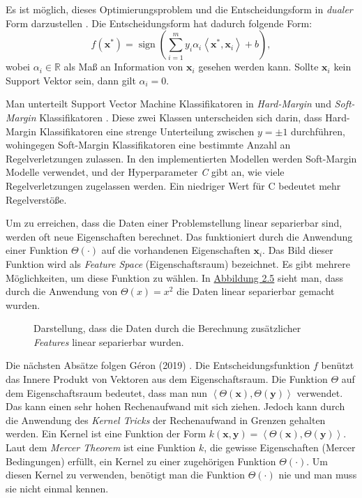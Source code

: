 Es ist m\"oglich, dieses Optimierungsproblem und die Entscheidungsform in \textit{dualer} Form darzustellen \cite[Seite 168]{handson}. Die Entscheidungsform hat dadurch folgende Form:
$$ f(\mathbf{x^*}) = \operatorname{sign}(\sum_{i=1}^m y_i\alpha_i \left\langle \mathbf{x^*}, \mathbf{x}_i \right\rangle + b), $$
wobei $\alpha_i \in \mathbb{R}$ als Ma{\ss} an Information von $\mathbf{x}_i$ gesehen werden kann. Sollte $\mathbf{x}_i$ kein Support Vektor sein, dann gilt $\alpha_i = 0$.

Man unterteilt Support Vector Machine Klassifikatoren in \textit{Hard-Margin} und \textit{Soft-Margin} Klassifikatoren \cite[Kapitel 15]{shalev}. Diese zwei Klassen
unterscheiden sich darin, dass Hard-Margin Klassifikatoren eine strenge Unterteilung zwischen $y = \pm1$ durchf\"uhren, wohingegen Soft-Margin
Klassifikatoren eine bestimmte Anzahl an Regelverletzungen zulassen. In den implementierten Modellen werden Soft-Margin Modelle verwendet, und der
Hyperparameter \textit{C} gibt an, wie viele Regelverletzungen zugelassen werden. Ein niedriger Wert f\"ur C bedeutet mehr Regelverst\"o{\ss}e.

Um zu erreichen, dass die Daten einer Problemstellung linear separierbar sind, werden oft neue Eigenschaften berechnet. Das funktioniert durch die
Anwendung einer Funktion $\Theta(\cdot)$ auf die vorhandenen Eigenschaften $\mathbf{x}_i$. Das Bild dieser Funktion wird als \textit{Feature Space} (Eigenschaftsraum) bezeichnet.
Es gibt mehrere M\"oglichkeiten, um diese Funktion zu w\"ahlen. In
\hyperref[fig:svm2]{Abbildung 2.5} sieht man, dass durch die Anwendung von $\Theta(x) = x^2$ die Daten linear separierbar gemacht wurden.

\begin{figure}[ht]
	\label{fig:svm2}
	\begin{center}
		\begin{tiny}
		\end{tiny}
	\end{center}
	\caption[Berechnung zus\"atzlicher Features aus vorhandenen Inputs]
	{Darstellung, dass die Daten durch die Berechnung zus\"atzlicher \textit{Features} linear separierbar wurden.}
\end{figure}

Die n\"achsten Abs\"atze folgen Géron (2019) \cite[Kapitel 5]{handson}. Die Entscheidungsfunktion $f$ ben\"utzt das Innere Produkt von Vektoren aus dem Eigenschaftsraum. Die Funktion $\Theta$ auf dem
Eigenschaftsraum bedeutet, dass man nun $\left\langle \Theta(\mathbf{x}), \Theta(\mathbf{y}) \right\rangle$ verwendet. Das kann einen sehr hohen Rechenaufwand
mit sich ziehen. Jedoch kann durch die Anwendung des \textit{Kernel Tricks} der Rechenaufwand in Grenzen gehalten werden. Ein Kernel ist eine Funktion
der Form $k(\mathbf{x}, \mathbf{y}) = \left\langle \Theta(\mathbf{x}), \Theta(\mathbf{y}) \right\rangle$. Laut dem \textit{Mercer Theorem} ist eine Funktion
$k$, die gewisse Eigenschaften (Mercer Bedingungen) erf\"ullt, ein Kernel zu einer zugeh\"origen Funktion $\Theta(\cdot)$. Um
diesen Kernel zu verwenden, benötigt man die Funktion $\Theta(\cdot)$ nie und man muss sie nicht einmal kennen.

